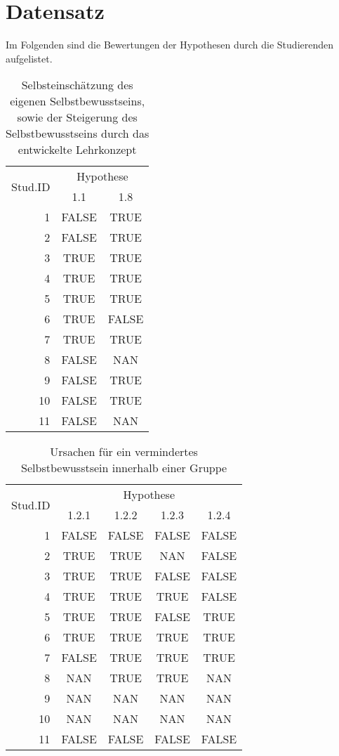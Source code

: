 \section*{Datensatz}\label{chap:dataset}
Im Folgenden sind die Bewertungen der Hypothesen durch die Studierenden aufgelistet.

\begin{table}[h!]
\caption{Selbsteinschätzung des eigenen Selbstbewusstseins, sowie der Steigerung des Selbstbewusstseins durch das entwickelte Lehrkonzept}
\label{tab:1}
\begin{center}
\begin{tabular}{|r|c|c|}
\hline
\multirow{2}{2cm}{Stud.ID} & \multicolumn{2}{|c|}{Hypothese}\\
 & 1.1 & 1.8\\
\hline
1 & FALSE & TRUE\\
2 & FALSE & TRUE\\
3 & TRUE & TRUE\\
4 & TRUE & TRUE\\
5 & TRUE & TRUE\\
6 & TRUE & FALSE\\
7 & TRUE & TRUE\\
8 & FALSE & NAN\\
9 & FALSE & TRUE\\
10 & FALSE & TRUE\\
11 & FALSE & NAN\\
\hline
\end{tabular}
\end{center}
\end{table}

\begin{table}[h!]
\caption{Ursachen für ein vermindertes Selbstbewusstsein innerhalb einer Gruppe}
\label{tab:2}
\begin{center}
\begin{tabular}{|r|c|c|c|c|}
\hline
\multirow{2}{2cm}{Stud.ID} & \multicolumn{4}{|c|}{Hypothese}\\
 & 1.2.1 & 1.2.2 & 1.2.3 & 1.2.4\\
\hline
1 & FALSE & FALSE & FALSE & FALSE\\
2 & TRUE & TRUE & NAN & FALSE\\
3 & TRUE & TRUE & FALSE & FALSE\\
4 & TRUE & TRUE & TRUE & FALSE\\
5 & TRUE & TRUE & FALSE & TRUE\\
6 & TRUE & TRUE & TRUE & TRUE\\
7 & FALSE & TRUE & TRUE & TRUE\\
8 & NAN & TRUE & TRUE & NAN\\
9 & NAN & NAN & NAN & NAN\\
10 & NAN & NAN & NAN & NAN\\
11 & FALSE & FALSE & FALSE & FALSE\\
\hline
\end{tabular}
\end{center}
\end{table}

